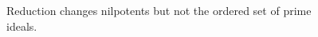 \begin{figure}[ht]\centering
{}
\caption{Reduction changes nilpotents but not the ordered set of prime ideals.}\label{fig:vi29-06}\end{figure}
